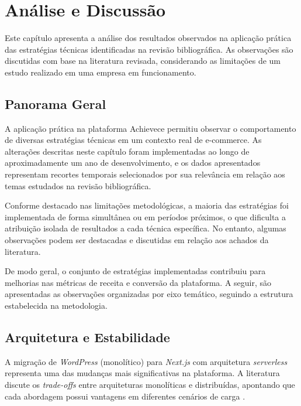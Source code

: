 \chapter{Análise e Discussão}
\label{ch:analise}

Este capítulo apresenta a análise dos resultados observados na aplicação prática das estratégias técnicas identificadas na revisão bibliográfica. As observações são discutidas com base na literatura revisada, considerando as limitações de um estudo realizado em uma empresa em funcionamento.

\section{Panorama Geral}

A aplicação prática na plataforma Achievece permitiu observar o comportamento de diversas estratégias técnicas em um contexto real de e-commerce. As alterações descritas neste capítulo foram implementadas ao longo de aproximadamente um ano de desenvolvimento, e os dados apresentados representam recortes temporais selecionados por sua relevância em relação aos temas estudados na revisão bibliográfica.

Conforme destacado nas limitações metodológicas, a maioria das estratégias foi implementada de forma simultânea ou em períodos próximos, o que dificulta a atribuição isolada de resultados a cada técnica específica. No entanto, algumas observações podem ser destacadas e discutidas em relação aos achados da literatura.

De modo geral, o conjunto de estratégias implementadas contribuiu para melhorias nas métricas de receita e conversão da plataforma. A seguir, são apresentadas as observações organizadas por eixo temático, seguindo a estrutura estabelecida na metodologia.

\section{Arquitetura e Estabilidade}

A migração de \textit{WordPress} (monolítico) para \textit{Next.js} com arquitetura \textit{serverless} representa uma das mudanças mais significativas na plataforma. A literatura discute os \textit{trade-offs} entre arquiteturas monolíticas e distribuídas, apontando que cada abordagem possui vantagens em diferentes cenários de carga \cite{ubur_reviewing_2023}.

